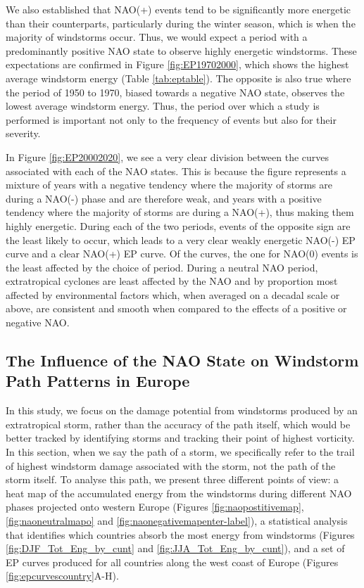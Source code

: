         We also established that NAO(+) events tend to be significantly more energetic than their counterparts, particularly during the winter season, which is when the majority of windstorms occur. Thus, we would expect a period with a predominantly positive NAO state to observe highly energetic windstorms. These expectations are confirmed in Figure \ref{fig:EP19702000}, which shows the highest average windstorm energy (Table \ref{tab:eptable}). The opposite is also true where the period of 1950 to 1970, biased towards a negative NAO state, observes the lowest average windstorm energy. Thus, the period over which a study is performed is important not only to the frequency of events but also for their severity.

        In Figure \ref{fig:EP20002020}, we see a very clear division between the curves associated with each of the NAO states. This is because the figure represents a mixture of years with a negative tendency where the majority of storms are during a NAO(-) phase and are therefore weak, and years with a positive tendency where the majority of storms are during a NAO(+), thus making them highly energetic. During each of the two periods, events of the opposite sign are the least likely to occur, which leads to a very clear weakly energetic NAO(-) EP curve and a clear NAO(+) EP curve. Of the curves, the one for NAO(0) events is the least affected by the choice of period. During a neutral NAO period, extratropical cyclones are least affected by the NAO and by proportion most affected by environmental factors which, when averaged on a decadal scale or above, are consistent and smooth when compared to the effects of a positive or negative NAO. 
    
    \subsection{The Influence of the NAO State on Windstorm Path Patterns in Europe}

        In this study, we focus on the damage potential from windstorms produced by an extratropical storm, rather than the accuracy of the path itself, which would be better tracked by identifying storms and tracking their point of highest vorticity. In this section, when we say the path of a storm, we specifically refer to the trail of highest windstorm damage associated with the storm, not the path of the storm itself. To analyse this path, we present three different points of view: a heat map of the accumulated energy from the windstorms during different NAO phases projected onto western Europe (Figures \ref{fig:naopostitivemap}, \ref{fig:naoneutralmapo} and \ref{fig:naonegativemapenter-label}), a statistical analysis that identifies which countries absorb the most energy from windstorms (Figures \ref{fig:DJF_Tot_Eng_by_cunt} and \ref{fig:JJA_Tot_Eng_by_cunt}), and a set of EP curves produced for all countries along the west coast of Europe (Figures \ref{fig:epcurvescountry}A-H).

